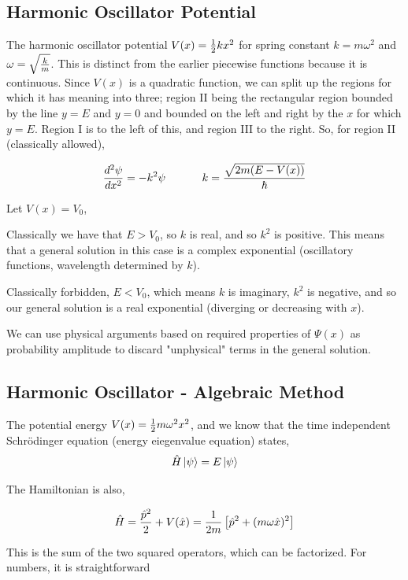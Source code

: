\documentclass[english, 11pt]{article}
\begin{document}
    \subsection{Harmonic Oscillator Potential}

      The harmonic oscillator potential $V(x) = \frac{1}{2}kx^2$ for spring constant $k = m\omega^2$ and $\omega = \sqrt{\frac{k}{m}}$. This is distinct from the earlier piecewise functions because it is continuous. Since $V(x)$ is a quadratic function, we can split up the regions for which it has meaning into three; region II being the rectangular region bounded by the line $y = E$ and $y = 0$ and bounded on the left and right by the $x$ for which $y = E$. Region I is to the left of this, and region III to the right. So, for region II (classically allowed),

      \[ \f{d^2\psi}{dx^2} = -k^2\psi \ \ \ \ \ \ \ \ \ \ k = \f{\sqrt{2m(E-V(x))}}{\hbar} \]

      Let $V(x) = V_0$,\newline

      Classically we have that $E > V_0$, so $k$ is real, and so $k^2$ is positive. This means that a general solution in this case is a complex exponential (oscillatory functions, wavelength determined by $k$).
      \newline

      Classically forbidden, $E<V_0$, which means $k$ is imaginary, $k^2$ is negative, and so our general solution is a real exponential (diverging or decreasing with $x$).\newline

      We can use physical arguments based on required properties of $\Psi(x)$ as probability amplitude to discard "unphysical" terms in the general solution.

    \subsection{Harmonic Oscillator - Algebraic Method}

      The potential energy $V(x) = \frac{1}{2}m \omega^2 x^2$, and we know that the time independent Schrödinger equation (energy eiegenvalue equation) states,
      \[ \hat{H}\left|\psi\right\rangle = E\left|\psi\right\rangle \]

      The Hamiltonian is also,

      \[ \hat{H} = \frac{\hat{p}^2}{2} + V(\hat{x}) = \frac{1}{2m} \left[ \hat{p}^2 + (m \omega \hat{x})^2 \right] \]

      This is the sum of the two squared operators, which can be factorized. For numbers, it is straightforward
\end{document}
